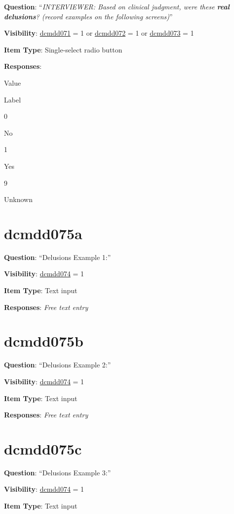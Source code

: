 \documentclass[
]{book}
\begin{document}
\textbf{Question}: ``\emph{INTERVIEWER: Based on clinical judgment, were these \textbf{real delusions}? (record examples on the following screens)}''

\textbf{Visibility}: \protect\hyperlink{dcmdd071}{dcmdd071} = 1 or \protect\hyperlink{dcmdd072}{dcmdd072} = 1 or \protect\hyperlink{dcmdd073}{dcmdd073} = 1

\textbf{Item Type}: Single-select radio button

\textbf{Responses}:

Value

Label

0

No

1

Yes

9

Unknown

\hypertarget{dcmdd075a}{%
\section{dcmdd075a}\label{dcmdd075a}}

\textbf{Question}: ``Delusions Example 1:''

\textbf{Visibility}: \protect\hyperlink{dcmdd074}{dcmdd074} = 1

\textbf{Item Type}: Text input

\textbf{Responses}: \emph{Free text entry}

\hypertarget{dcmdd075b}{%
\section{dcmdd075b}\label{dcmdd075b}}

\textbf{Question}: ``Delusions Example 2:''

\textbf{Visibility}: \protect\hyperlink{dcmdd074}{dcmdd074} = 1

\textbf{Item Type}: Text input

\textbf{Responses}: \emph{Free text entry}

\hypertarget{dcmdd075c}{%
\section{dcmdd075c}\label{dcmdd075c}}

\textbf{Question}: ``Delusions Example 3:''

\textbf{Visibility}: \protect\hyperlink{dcmdd074}{dcmdd074} = 1

\textbf{Item Type}: Text input
\end{document}

